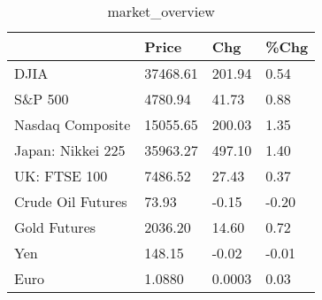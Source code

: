 \documentclass{article}%
\begin{document}
%


\begin{table}[htbp]%
\caption{market\_overview}%
\centering%
\begin{adjustbox}{width=1\textwidth}%
\begin{tabular}{llll}
\toprule
                  &    Price &    Chg &  \%Chg \\
\midrule
             DJIA & 37468.61 & 201.94 &  0.54 \\
          S\&P 500 &  4780.94 &  41.73 &  0.88 \\
 Nasdaq Composite & 15055.65 & 200.03 &  1.35 \\
Japan: Nikkei 225 & 35963.27 & 497.10 &  1.40 \\
     UK: FTSE 100 &  7486.52 &  27.43 &  0.37 \\
Crude Oil Futures &    73.93 &  -0.15 & -0.20 \\
     Gold Futures &  2036.20 &  14.60 &  0.72 \\
              Yen &   148.15 &  -0.02 & -0.01 \\
             Euro &   1.0880 & 0.0003 &  0.03 \\
\bottomrule
\end{tabular}
%
\end{adjustbox}%
\end{table}

%
\end{document}
